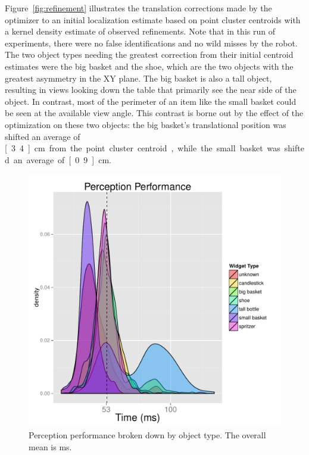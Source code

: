 \documentclass[letterpaper, 10 pt, conference]{ieeeconf}  %
\begin{document}
Figure~\ref{fig:refinement} illustrates the translation corrections
made by the optimizer to an initial localization estimate based on
point cluster centroids with a kernel density estimate of observed
refinements. Note that in this run of experiments, there were no false
identifications and no wild misses by the robot. The two object types
needing the greatest correction from their initial centroid estimates
were the big basket and the shoe, which are the two objects with the
greatest asymmetry in the XY plane. The big basket is also a tall
object, resulting in views looking down the table that primarily see
the near side of the object. In contrast, most of the perimeter of an
item like the small basket could be seen at the available view
angle. This contrast is borne out by the effect of the optimization on
these two objects: the big basket's translational position was shifted
an average of \unit[3.4]{cm} from the point cluster centroid, while the small
basket was shifted an average of \unit[0.9]{cm}.


\begin{figure}[t]
\centering
\includegraphics[width=\columnwidth]{figures/perception-density.pdf}
\caption{ Perception performance broken down by object type. The
  overall mean is \unit[53]{ms}.  }
\label{fig:perception-density}
\end{figure}
\end{document}
